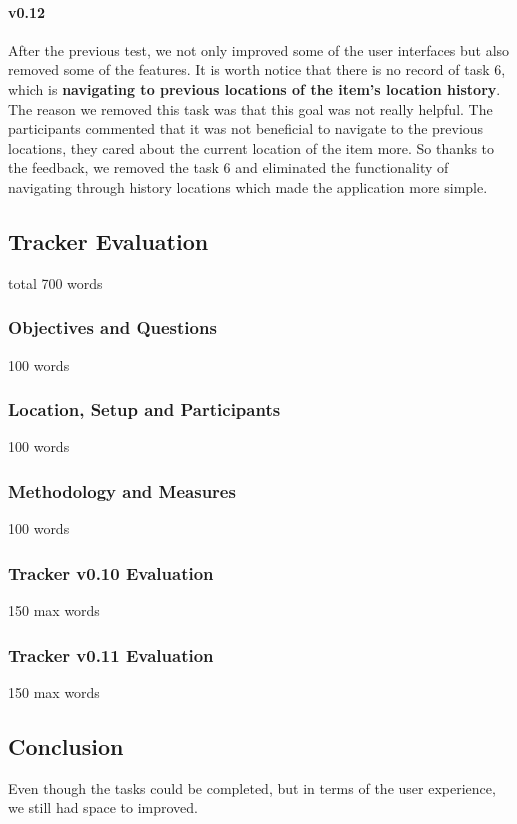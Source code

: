 \documentclass[12pt,a4paper]{article}
\begin{document}
          \paragraph{v0.12} After the previous test, we not only improved some of the user interfaces but also removed some of the features. It is worth notice that there is no record of task 6, which is {\bf navigating to previous locations of the item's location history}. The reason we removed this task was that this goal was not really helpful. The participants commented that it was not beneficial to navigate to the previous locations, they cared about the current location of the item more. So thanks to the feedback, we removed the task 6 and eliminated the functionality of navigating through history locations which made the application more simple. 
        
        \subsection{Tracker Evaluation}
            total 700 words
          \subsubsection{Objectives and Questions}
            100 words
          \subsubsection{Location, Setup and Participants}
            100 words
          \subsubsection{Methodology and Measures}
            100 words
          \subsubsection{Tracker v0.10 Evaluation}
            150 max words
          \subsubsection{Tracker v0.11 Evaluation}
            150 max words
        \subsection{Conclusion}
          Even though the tasks could be completed, but in terms of the user experience, we still had space to improved. 
      \newpage
\end{document}
